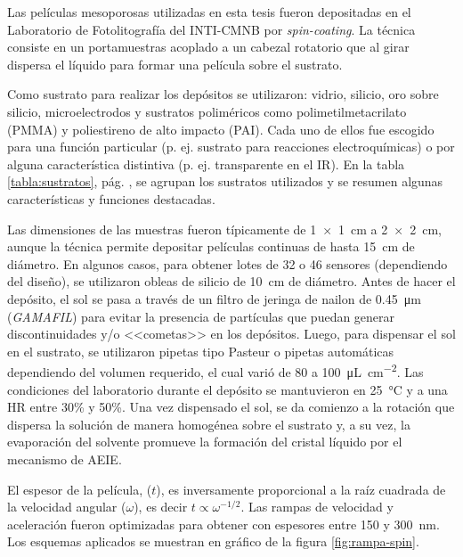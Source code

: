 			Las películas mesoporosas utilizadas en esta tesis fueron depositadas en el Laboratorio de Fotolitografía del INTI-CMNB por \textit{spin-coating}. La técnica consiste en un portamuestras acoplado a un cabezal rotatorio que al girar dispersa el líquido para formar una película sobre el sustrato.

			Como sustrato para realizar los depósitos se utilizaron: vidrio, silicio, oro sobre silicio, microelectrodos y sustratos poliméricos como  polimetilmetacrilato (PMMA) y poliestireno de alto impacto (PAI). Cada uno de ellos fue escogido para una función particular (p. ej. sustrato para reacciones electroquímicas) o por alguna característica distintiva (p. ej. transparente en el IR). En la tabla \ref{tabla:sustratos}, pág. \pageref{tabla:sustratos}, se agrupan los sustratos utilizados y se resumen algunas características y funciones destacadas.

			Las dimensiones de las muestras fueron típicamente de \SI{1x1}{\cm} a \linebreak \SI{2x2}{\cm}, aunque la técnica permite depositar películas continuas de hasta \SI{15}{cm} de diámetro. En algunos casos, para obtener lotes de 32 o 46 sensores (dependiendo del diseño), se utilizaron obleas de silicio de \SI{10}{\cm} de diámetro. Antes de hacer el depósito, el sol se pasa a través de un filtro de jeringa de nailon de \SI{0.45}{\um} (\textit{GAMAFIL}) para evitar la presencia de partículas que puedan generar discontinuidades y/o <<cometas>> en los depósitos\cite{Franssila2004}. Luego, para dispensar el sol en el sustrato, se utilizaron pipetas tipo Pasteur o pipetas automáticas dependiendo del volumen requerido, el cual varió de 80 a \SI{100}{\uL.\cm^{-2}}. Las condiciones del laboratorio durante el depósito se mantuvieron en \SI{25}{\celsius} y a una HR entre 30\% y 50\%. Una vez dispensado el sol, se da comienzo a la rotación que dispersa la solución de manera homogénea sobre el sustrato y, a su vez, la evaporación del solvente promueve la formación del cristal líquido por el mecanismo de AEIE\cite{Brinker1999}.


			El espesor de la película, ($t$), es inversamente proporcional a la raíz cuadrada de la velocidad angular ($\omega$), es decir $t\propto \omega ^{-1/2}$. Las rampas de velocidad y aceleración fueron optimizadas para obtener \pdm\space con espesores entre 150 y \SI{300}{\nm}\cite{Meyerhofer1978,Hall1998,Brinker1990}. Los esquemas aplicados se muestran en gráfico de la figura \ref{fig:rampa-spin}. 
				
